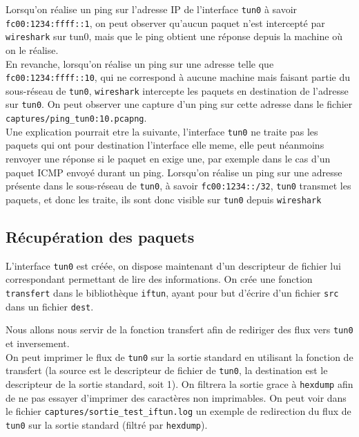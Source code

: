 \documentclass[a4paper, 10pt]{article}
\begin{document}
      Lorsqu'on réalise un ping sur l'adresse IP de l'interface \verb+tun0+ à
      savoir \verb+fc00:1234:ffff::1+, on peut observer qu'aucun paquet n'est
      intercepté par \verb+wireshark+ sur tun0, mais que le ping obtient une
      réponse depuis la machine où on le réalise. \\

      En revanche, lorsqu'on réalise un ping sur une adresse telle que
      \verb+fc00:1234:ffff::10+, qui ne correspond à aucune machine mais faisant
      partie du sous-réseau de \verb+tun0+, \verb+wireshark+ intercepte les
      paquets en destination de l'adresse sur \verb+tun0+. On peut observer une
      capture d'un ping sur cette adresse dans le fichier
      \verb+captures/ping_tun0:10.pcapng+.\\

      Une explication pourrait etre la suivante, l'interface \verb+tun0+ ne
      traite pas les paquets qui ont pour destination l'interface elle meme,
      elle peut néanmoins renvoyer une réponse si le paquet en exige une, par
      exemple dans le cas d'un paquet ICMP envoyé durant un ping.
      Lorsqu'on réalise un ping sur une adresse présente dans le sous-réseau de
      \verb+tun0+, à savoir \verb+fc00:1234::/32+, \verb+tun0+ transmet les
      paquets, et donc les traite, ils sont donc visible sur \verb+tun0+ depuis
      \verb+wireshark+

    \subsection{Récupération des paquets}

      L'interface \verb+tun0+ est créée, on dispose maintenant d'un descripteur
      de fichier lui correspondant permettant de lire des informations. On crée
      une fonction \verb+transfert+ dans le bibliothèque \verb+iftun+, ayant
      pour but d'écrire d'un fichier \verb+src+ dans un fichier \verb+dest+.

      Nous allons nous servir de la fonction transfert afin de rediriger des
      flux vers \verb+tun0+ et inversement. \\

      On peut imprimer le flux de \verb+tun0+ sur la sortie standard en
      utilisant la fonction de transfert (la source est le descripteur de
      fichier de \verb+tun0+, la destination est le descripteur de la sortie
      standard, soit 1). On filtrera la sortie grace à \verb+hexdump+ afin de ne
      pas essayer d'imprimer des caractères non imprimables. On peut voir dans
      le fichier \verb+captures/sortie_test_iftun.log+ un exemple de redirection
      du flux de \verb+tun0+ sur la sortie standard (filtré par \verb+hexdump+).
\end{document}

